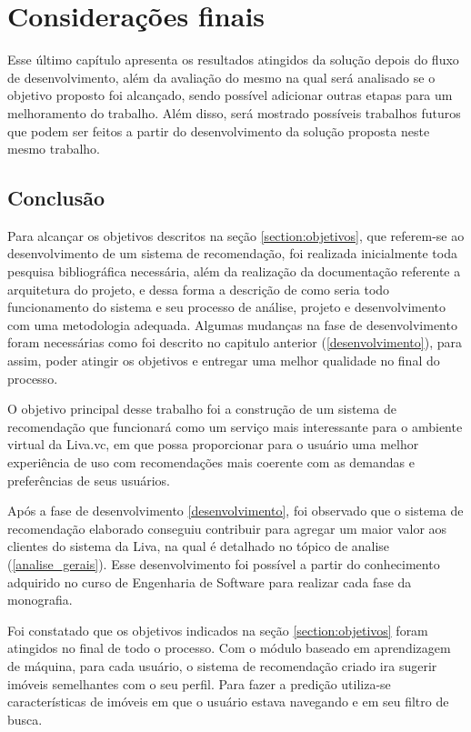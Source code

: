 \chapter{Considerações finais}

Esse último capítulo apresenta os resultados atingidos da solução depois do fluxo de desenvolvimento, além da avaliação do mesmo na qual será analisado se o objetivo proposto foi alcançado, sendo possível adicionar outras etapas para um melhoramento do trabalho. Além disso, será mostrado possíveis trabalhos futuros que podem ser feitos a partir do desenvolvimento da solução proposta neste mesmo trabalho.

\section{Conclusão}

Para alcançar os objetivos descritos na seção \ref{section:objetivos}, que referem-se ao desenvolvimento de um sistema de recomendação, foi realizada inicialmente toda pesquisa bibliográfica necessária, além da realização da documentação referente a arquitetura do projeto, e dessa forma a descrição de como seria todo funcionamento do sistema e seu processo de análise, projeto e desenvolvimento com uma metodologia adequada. Algumas mudanças na fase de desenvolvimento foram necessárias como foi descrito no capitulo anterior (\ref{desenvolvimento}), para assim, poder atingir os objetivos e entregar uma melhor qualidade no final do processo.

O objetivo principal desse trabalho foi a construção de um sistema de recomendação que funcionará como um serviço mais interessante para o ambiente virtual da Liva.vc, em que possa proporcionar para o usuário uma melhor experiência de uso com recomendações mais coerente com as demandas e preferências de seus usuários.

Após a fase de desenvolvimento \ref{desenvolvimento}, foi observado que o sistema de recomendação elaborado conseguiu contribuir para agregar um maior valor aos clientes do sistema da Liva, na qual é detalhado no tópico de analise (\ref{analise_gerais}). Esse desenvolvimento foi possível a partir do conhecimento adquirido no curso de Engenharia de Software para realizar cada fase da monografia.

Foi constatado que os objetivos indicados na seção \ref{section:objetivos} foram atingidos no final de todo o processo. Com o módulo baseado em aprendizagem de máquina, para cada usuário, o sistema de recomendação criado ira sugerir imóveis semelhantes com o seu perfil. Para fazer a predição utiliza-se características de imóveis em que o usuário estava navegando e em seu filtro de busca.


